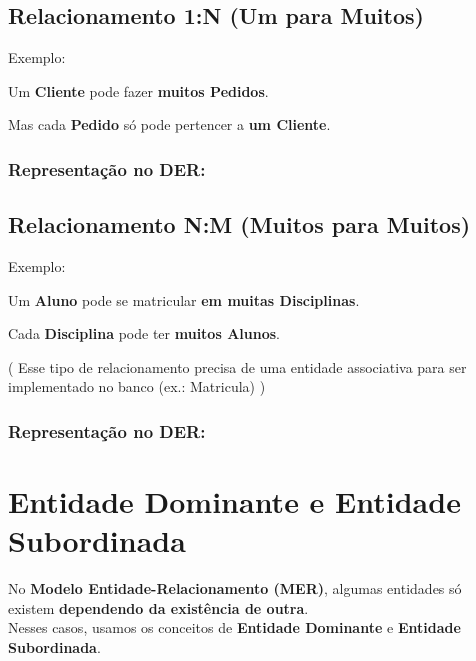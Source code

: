 \documentclass[
]{book}
\makeatletter
\newcommand*\pandocbounded[1]{%
  \sbox\pandoc@box{#1}%
  \Gscale@div\@tempa{\textheight}{\dimexpr\ht\pandoc@box+\dp\pandoc@box\relax}%
  \Gscale@div\@tempb{\linewidth}{\wd\pandoc@box}%
  \ifdim\@tempb\p@<\@tempa\p@\let\@tempa\@tempb\fi%
  \ifdim\@tempa\p@<\p@\scalebox{\@tempa}{\usebox\pandoc@box}%
  \else\usebox{\pandoc@box}%
  \fi%
}
\makeatother
\begin{document}
\pandocbounded{}

\subsection{\texorpdfstring{Relacionamento \textbf{1:N (Um para Muitos)}}{Relacionamento 1:N (Um para Muitos)}}\label{relacionamento-1n-um-para-muitos}

Exemplo:

Um \textbf{Cliente} pode fazer \textbf{muitos Pedidos}.

Mas cada \textbf{Pedido} só pode pertencer a \textbf{um Cliente}.

\subsubsection{Representação no DER:}\label{representauxe7uxe3o-no-der-1}

\pandocbounded{}

\subsection{Relacionamento N:M (Muitos para Muitos)}\label{relacionamento-nm-muitos-para-muitos}

Exemplo:

Um \textbf{Aluno} pode se matricular \textbf{em muitas Disciplinas}.

Cada \textbf{Disciplina} pode ter \textbf{muitos Alunos}.

( Esse tipo de relacionamento precisa de uma entidade associativa para ser implementado no banco (ex.: Matricula) )

\subsubsection{Representação no DER:}\label{representauxe7uxe3o-no-der-2}

\pandocbounded{}

\section{Entidade Dominante e Entidade Subordinada}\label{entidade-dominante-e-entidade-subordinada}

No \textbf{Modelo Entidade-Relacionamento (MER)}, algumas entidades só existem \textbf{dependendo da existência de outra}.\\
Nesses casos, usamos os conceitos de \textbf{Entidade Dominante} e \textbf{Entidade Subordinada}.
\end{document}
